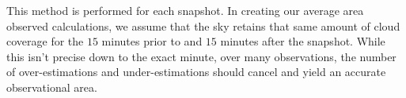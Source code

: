 This method is performed for each snapshot.
In creating our average area observed calculations, we assume that the sky retains that same amount of cloud coverage for the $15$ minutes prior to and $15$ minutes after the snapshot.
While this isn't precise down to the exact minute, over many observations, the number of over-estimations and under-estimations should cancel and yield an accurate observational area.























 